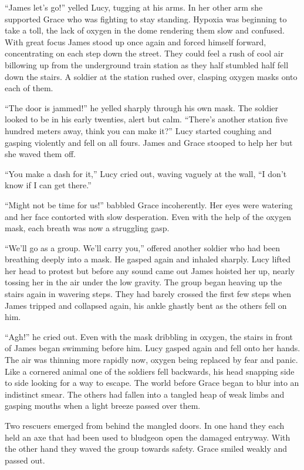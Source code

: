 \documentclass[12pt]{article} %
\begin{document}
``James let's go!'' yelled Lucy, tugging at his arms. In her other arm she supported Grace who was fighting to stay standing. Hypoxia was beginning to take a toll, the lack of oxygen in the dome rendering them slow and confused. With great focus James stood up once again and forced himself forward, concentrating on each step down the street. They could feel a rush of cool air billowing up from the underground train station as they half stumbled half fell down the stairs. A soldier at the station rushed over, clasping oxygen masks onto each of them.

``The door is jammed!'' he yelled sharply through his own mask. The soldier looked to be in his early twenties, alert but calm. ``There's another station five hundred meters away, think you can make it?'' Lucy started coughing and gasping violently and fell on all fours. James and Grace stooped to help her but she waved them off.

``You make a dash for it,'' Lucy cried out, waving vaguely at the wall, ``I don't know if I can get there.''

``Might not be time for us!'' babbled Grace incoherently. Her eyes were watering and her face contorted with slow desperation. Even with the help of the oxygen mask, each breath was now a struggling gasp.

``We'll go as a group. We'll carry you,'' offered another soldier who had been breathing deeply into a mask. He gasped again and inhaled sharply. Lucy lifted her head to protest but before any sound came out James hoisted her up, nearly tossing her in the air under the low gravity. The group began heaving up the stairs again in wavering steps. They had barely crossed the first few steps when James tripped and collapsed again, his ankle ghastly bent as the others fell on him.

``Agh!'' he cried out. Even with the mask dribbling in oxygen, the stairs in front of James began swimming before him. Lucy gasped again and fell onto her hands. The air was thinning more rapidly now, oxygen being replaced by fear and panic. Like a cornered animal one of the soldiers fell backwards, his head snapping side to side looking for a way to escape. The world before Grace began to blur into an indistinct smear. The others had fallen into a tangled heap of weak limbs and gasping mouths when a light breeze passed over them.

Two rescuers emerged from behind the mangled doors. In one hand they each held an axe that had been used to bludgeon open the damaged entryway. With the other hand they waved the group towards safety. Grace smiled weakly and passed out.
\end{document}
